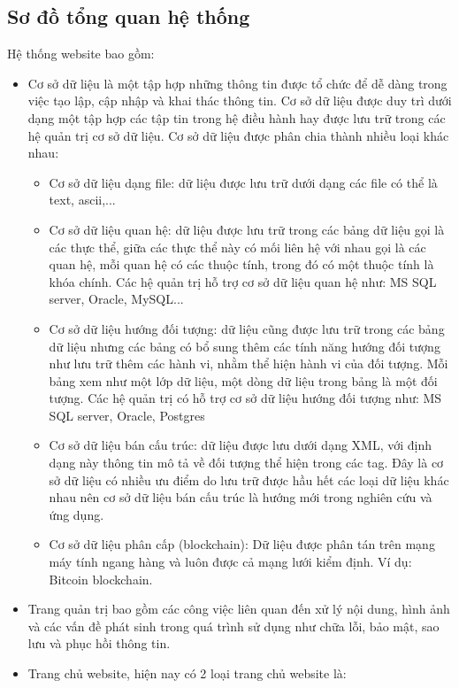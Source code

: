 \subsection{Sơ đồ tổng quan hệ thống}
Hệ thống website bao gồm:
\begin{itemize}
    \item Cơ sở dữ liệu là một tập hợp những thông tin được tổ chức để dễ dàng trong việc tạo lập, cập nhập và khai thác thông tin. Cơ sở dữ liệu được duy trì dưới dạng một tập hợp các tập tin trong hệ điều hành hay được lưu trữ trong các hệ quản trị cơ sở dữ liệu. Cơ sở dữ liệu được phân chia thành nhiều loại khác nhau:
   \begin{itemize}
   \item Cơ sở dữ liệu dạng file: dữ liệu được lưu trữ dưới dạng các file có thể là text, ascii,...
   \item Cơ sở dữ liệu quan hệ: dữ liệu được lưu trữ trong các bảng dữ liệu gọi là các thực thể, giữa các thực thể này có mối liên hệ với nhau gọi là các quan hệ, mỗi quan hệ có các thuộc tính, trong đó có một thuộc tính là khóa chính. Các hệ quản trị hỗ trợ cơ sở dữ liệu quan hệ như: MS SQL server, Oracle, MySQL...
   \item Cơ sở dữ liệu hướng đối tượng: dữ liệu cũng được lưu trữ trong các bảng dữ liệu nhưng các bảng có bổ sung thêm các tính năng hướng đối tượng như lưu trữ thêm các hành vi, nhằm thể hiện hành vi của đối tượng. Mỗi bảng xem như một lớp dữ liệu, một dòng dữ liệu trong bảng là một đối tượng. Các hệ quản trị có hỗ trợ cơ sở dữ liệu hướng đối tượng như: MS SQL server, Oracle, Postgres
   \item Cơ sở dữ liệu bán cấu trúc: dữ liệu được lưu dưới dạng XML, với định dạng này thông tin mô tả về đối tượng thể hiện trong các tag. Đây là cơ sở dữ liệu có nhiều ưu điểm do lưu trữ được hầu hết các loại dữ liệu khác nhau nên cơ sở dữ liệu bán cấu trúc là hướng mới trong nghiên cứu và ứng dụng.
   \item Cơ sở dữ liệu phân cấp (blockchain): Dữ liệu được phân tán trên mạng máy tính ngang hàng và luôn được cả mạng lưới kiểm định. Ví dụ: Bitcoin blockchain.
   \end{itemize}
    \item Trang quản trị bao gồm các công việc liên quan đến xử lý nội dung, hình ảnh và các vấn đề phát sinh trong quá trình sử dụng như chữa lỗi, bảo mật, sao lưu và phục hồi thông tin.
    \item Trang chủ website, hiện nay có 2 loại trang chủ website là: 
    \begin{itemize}

\end{itemize}
\end{itemize}
